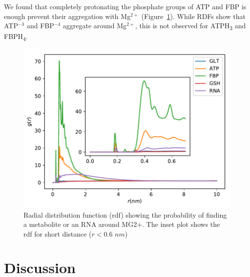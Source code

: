 \documentclass[journal=jacsat,manuscript=article]{achemso}
\begin{document}
We found that completely protonating the phosphate groups of ATP and FBP is enough prevent their aggregation with Mg$^{2+}$ (Figure~\ref{fig:avoiding_aggregation}). While RDFs show that ATP$^{-3}$ and FBP$^{-4}$ aggregate around Mg$^{2+}$, this is not observed for ATPH\textsubscript{3} and FBPH\textsubscript{4}.

\begin{figure}[H]
\includegraphics[scale=0.5]{rdf_mg.pdf}
\caption{Radial distribution function (rdf) showing the probability of finding a metabolite or an RNA around MG2+. The inset plot shows the rdf for short distance ($ r < 0.6 \,\, nm$) }
\label{fig:avoiding_aggregation}
\end{figure}


 
 
 
 
 
 
 
 
 
 
 
 
 
\section*{Discussion}\label{sec:dissc}
\end{document}
